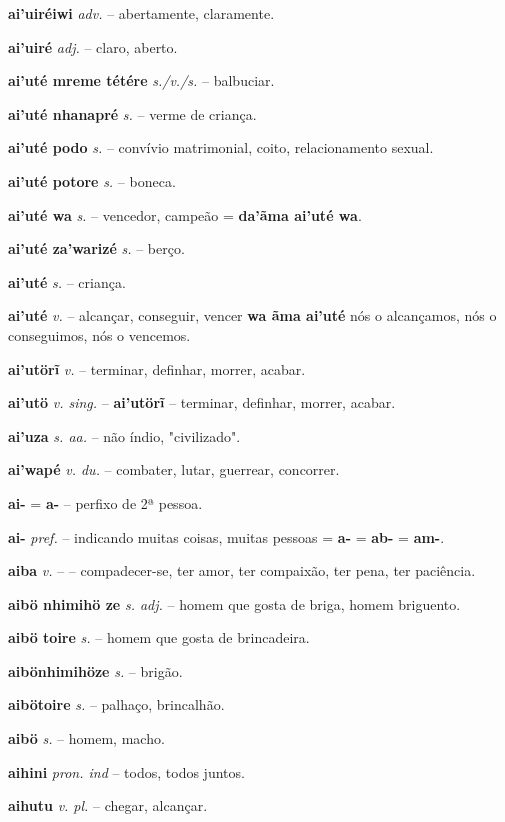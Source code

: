 \textbf{ai'uiréiwi} \textit{adv.} -- abertamente, claramente.

\textbf{ai'uiré} \textit{adj.} -- claro, aberto.

\textbf{ai'uté mreme tétére} \textit{s./v./s.} -- balbuciar.

\textbf{ai'uté nhanapré} \textit{s.} -- verme de criança.

\textbf{ai'uté podo} \textit{s.} -- convívio matrimonial, coito, relacionamento sexual.

\textbf{ai'uté potore} \textit{s.} -- boneca.

\textbf{ai'uté wa} \textit{s.} -- vencedor, campeão = \textbf{da'ãma ai'uté wa}.

\textbf{ai'uté za'warizé} \textit{s.} -- berço.

\textbf{ai'uté} \textit{s.} -- criança.

\textbf{ai'uté} \textit{v.} -- alcançar, conseguir, vencer  \textbf{wa ãma ai'uté} nós o alcançamos, nós o conseguimos, nós o vencemos.

\textbf{ai'utörĩ} \textit{v.} -- terminar, definhar, morrer, acabar.

\textbf{ai'utö} \textit{v. sing.} -- \textbf{ai'utörĩ} -- terminar, definhar, morrer, acabar.

\textbf{ai'uza} \textit{s. aa.} -- não índio, "civilizado".

\textbf{ai'wapé} \textit{v. du.} -- combater, lutar, guerrear, concorrer.

\textbf{ai-} = \textbf{a-} -- perfixo de 2ª pessoa.

\textbf{ai-} \textit{pref.} -- indicando muitas coisas, muitas pessoas  = \textbf{a-} = \textbf{ab-} = \textbf{am-}.

\textbf{aiba} \textit{v.} -- -- compadecer-se, ter amor, ter compaixão, ter pena, ter paciência.

\textbf{aibö nhimihö ze} \textit{s. adj.} -- homem que gosta de briga, homem briguento.

\textbf{aibö toire} \textit{s.} -- homem que gosta de brincadeira.

\textbf{aibönhimihöze} \textit{s.} -- brigão.

\textbf{aibötoire} \textit{s.} -- palhaço, brincalhão.

\textbf{aibö} \textit{s.} -- homem, macho.

\textbf{aihini} \textit{pron. ind} -- todos, todos juntos.

\textbf{aihutu} \textit{v. pl.} -- chegar, alcançar.

